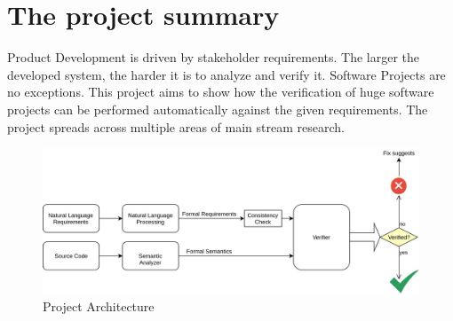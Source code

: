 \section{The project summary}
Product Development is driven by stakeholder requirements. The larger the developed system, the harder it is to analyze and verify it. Software Projects are no exceptions. This project aims to show how the verification of huge software projects can be performed automatically against the given requirements. The project spreads across multiple areas of main stream research.

\begin{figure}[hbpt]
	\centering
	\includegraphics[width=1\linewidth]{Architecture}
	\caption[PorjArch]{Project Architecture}
	\label{fig:architectture}
\end{figure}


